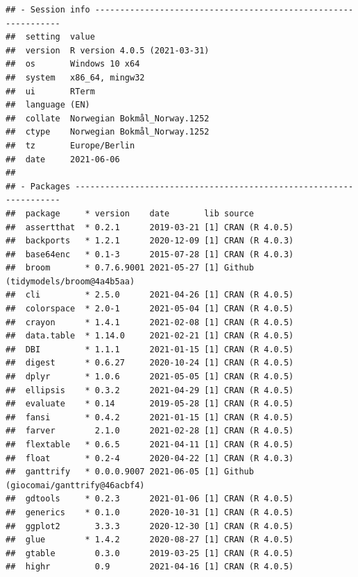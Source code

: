 \documentclass[
  11pt,
]{article}
\begin{document}
\begin{verbatim}
## - Session info ---------------------------------------------------------------
##  setting  value                       
##  version  R version 4.0.5 (2021-03-31)
##  os       Windows 10 x64              
##  system   x86_64, mingw32             
##  ui       RTerm                       
##  language (EN)                        
##  collate  Norwegian Bokmål_Norway.1252
##  ctype    Norwegian Bokmål_Norway.1252
##  tz       Europe/Berlin               
##  date     2021-06-06                  
## 
## - Packages -------------------------------------------------------------------
##  package     * version    date       lib source                             
##  assertthat  * 0.2.1      2019-03-21 [1] CRAN (R 4.0.5)                     
##  backports   * 1.2.1      2020-12-09 [1] CRAN (R 4.0.3)                     
##  base64enc   * 0.1-3      2015-07-28 [1] CRAN (R 4.0.3)                     
##  broom       * 0.7.6.9001 2021-05-27 [1] Github (tidymodels/broom@4a4b5aa)  
##  cli         * 2.5.0      2021-04-26 [1] CRAN (R 4.0.5)                     
##  colorspace  * 2.0-1      2021-05-04 [1] CRAN (R 4.0.5)                     
##  crayon      * 1.4.1      2021-02-08 [1] CRAN (R 4.0.5)                     
##  data.table  * 1.14.0     2021-02-21 [1] CRAN (R 4.0.5)                     
##  DBI         * 1.1.1      2021-01-15 [1] CRAN (R 4.0.5)                     
##  digest      * 0.6.27     2020-10-24 [1] CRAN (R 4.0.5)                     
##  dplyr       * 1.0.6      2021-05-05 [1] CRAN (R 4.0.5)                     
##  ellipsis    * 0.3.2      2021-04-29 [1] CRAN (R 4.0.5)                     
##  evaluate    * 0.14       2019-05-28 [1] CRAN (R 4.0.5)                     
##  fansi       * 0.4.2      2021-01-15 [1] CRAN (R 4.0.5)                     
##  farver        2.1.0      2021-02-28 [1] CRAN (R 4.0.5)                     
##  flextable   * 0.6.5      2021-04-11 [1] CRAN (R 4.0.5)                     
##  float       * 0.2-4      2020-04-22 [1] CRAN (R 4.0.3)                     
##  ganttrify   * 0.0.0.9007 2021-06-05 [1] Github (giocomai/ganttrify@46acbf4)
##  gdtools     * 0.2.3      2021-01-06 [1] CRAN (R 4.0.5)                     
##  generics    * 0.1.0      2020-10-31 [1] CRAN (R 4.0.5)                     
##  ggplot2       3.3.3      2020-12-30 [1] CRAN (R 4.0.5)                     
##  glue        * 1.4.2      2020-08-27 [1] CRAN (R 4.0.5)                     
##  gtable        0.3.0      2019-03-25 [1] CRAN (R 4.0.5)                     
##  highr         0.9        2021-04-16 [1] CRAN (R 4.0.5)                     

\end{verbatim}
\end{document}
